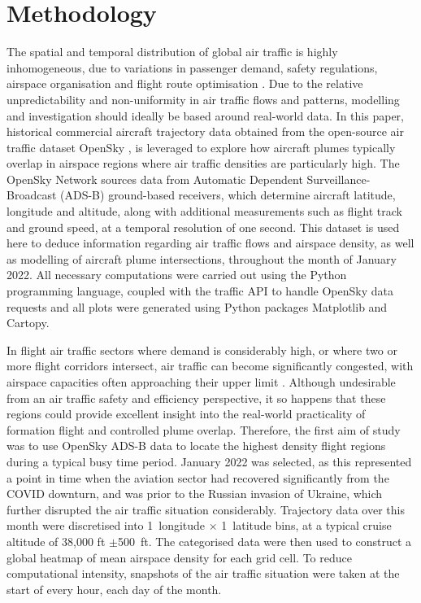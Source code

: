 \section{Methodology}
\label{meth}
The spatial and temporal distribution of global air traffic is highly inhomogeneous, due to variations in passenger demand, safety regulations, airspace organisation and flight route optimisation \cite{Gossling2020}. Due to the relative unpredictability and non-uniformity in air traffic flows and patterns, modelling and investigation should ideally be based around real-world data. In this paper, historical commercial aircraft trajectory data obtained from the open-source air traffic dataset OpenSky \cite{Schafer2014}, is leveraged to explore how aircraft plumes typically overlap in airspace regions where air traffic densities are particularly high. The OpenSky Network sources data from Automatic Dependent Surveillance-Broadcast (ADS-B) ground-based receivers, which determine aircraft latitude, longitude and altitude, along with additional measurements such as flight track and ground speed, at a temporal resolution of one second. This dataset is used here to deduce information regarding air traffic flows and airspace density, as well as modelling of aircraft plume intersections, throughout the month of January 2022. All necessary computations were carried out using the Python programming language, coupled with the traffic API \cite{Olive2019} to handle OpenSky data requests and all plots were generated using Python packages Matplotlib and Cartopy.

In flight air traffic sectors where demand is considerably high, or where two or more flight corridors intersect, air traffic can become significantly congested, with airspace capacities often approaching their upper limit \cite{Odoni1987}. Although undesirable from an air traffic safety and efficiency perspective, it so happens that these regions could provide excellent insight into the real-world practicality of formation flight and controlled plume overlap. Therefore, the first aim of study was to use OpenSky ADS-B data to locate the highest density flight regions during a typical busy time period. January 2022 was selected, as this represented a point in time when the aviation sector had recovered significantly from the COVID downturn, and was prior to the Russian invasion of Ukraine, which further disrupted the air traffic situation considerably. Trajectory data over this month were discretised into 1\textdegree\ longitude $\times$ 1\textdegree\ latitude bins, at a typical cruise altitude of 38,000 ft $\pm$500~ft. The categorised data were then used to construct a global heatmap of mean airspace density for each grid cell. To reduce computational intensity, snapshots of the air traffic situation were taken at the start of every hour, each day of the month. 


